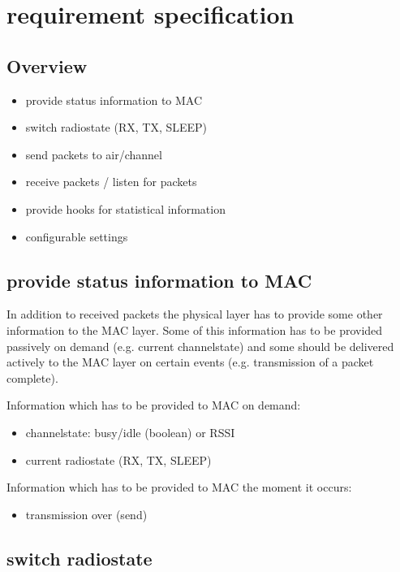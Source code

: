 \section{requirement specification}
\label{req_spec}

\subsection{Overview}
\label{overview}

\begin{itemize}
 \item provide status information to MAC
 \item switch radiostate (RX, TX, SLEEP)
 \item send packets to air/channel
 \item receive packets / listen for packets
 \item provide hooks for statistical information
 \item configurable settings
\end{itemize}

\subsection{provide status information to MAC}
\label{stateInfo}

In addition to received packets the physical layer has to provide some other information to the MAC layer.
Some of this information has to be provided passively on demand (e.g. current channelstate) and some should be delivered actively to the MAC layer on certain events (e.g. transmission of a packet complete).

\noindent Information which has to be provided to MAC on demand:
\begin{itemize}
 \item channelstate: busy/idle (boolean) or RSSI
 \item current radiostate (RX, TX, SLEEP)
\end{itemize}

\noindent Information which has to be provided to MAC the moment it occurs:
\begin{itemize}
 \item transmission over (send)
\end{itemize}


\subsection{switch radiostate}
\label{switchstates}

